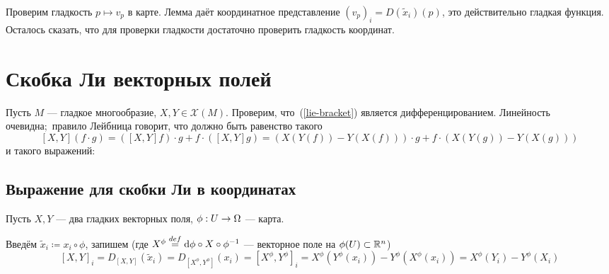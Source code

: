 \documentclass[a4paper]{report}
\begin{document}
{{    Проверим гладкость $p \mapsto v_p$ в карте.
        Лемма даёт координатное представление $(v_p)_i = D(\tilde{x}_i)(p)$, это действительно гладкая функция.
    Осталось сказать, что для проверки гладкости достаточно проверить гладкость координат.
    }
    }
    \section{Скобка Ли векторных полей}
    Пусть $M$ --- гладкое многообразие, $X, Y \in \mathscr{X}(M)$.
    Проверим, что~(\ref{lie-bracket}) является дифференцированием.
    Линейность очевидна;\ правило Лейбница говорит, что должно быть равенство такого
    \[[X, Y](f \cdot g) = ([X, Y]f) \cdot g + f \cdot ([X, Y]g) = (X(Y(f)) - Y(X(f))) \cdot g + f \cdot (X(Y(g)) - Y(X(g)))\]
    и такого выражений:
    \subsection{Выражение для скобки Ли в координатах}
    \label{coordinate-for-lie-bracket}
    Пусть $X, Y$ --- два гладких векторных поля, $\phi: U \rightarrow \Omega$ --- карта.

    Введём $\tilde{x}_i \coloneqq x_i \circ \phi$, запишем (где $X^\phi \overset{def}{=} \operatorname{d}\!\phi \circ X \circ \phi^{-1}$ --- векторное поле на $\phi(U) \subset \mathbb{R}^n$)
    \[[X, Y]_i = D_{[X, Y]}(\tilde{x}_i) =D_{[X^\phi, Y^\phi]}(x_i) = [X^\phi, Y^\phi]_i = X^\phi (Y^\phi(x_i)) - Y^\phi (X^\phi(x_i)) = X^{\phi}(Y_i) - Y^{\phi}(X_i) \]
\end{document}
